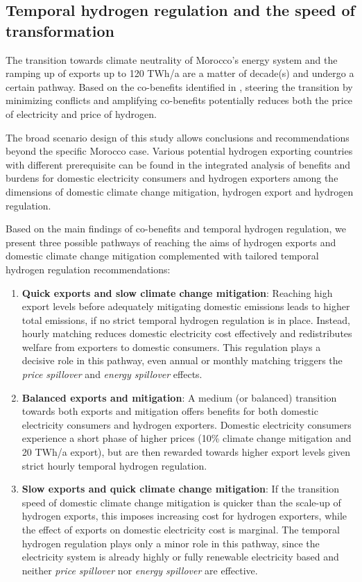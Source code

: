 \subsection*{Temporal hydrogen regulation and the speed of transformation}
\label{subsec:timepath}
The transition towards climate neutrality of Morocco's energy system and the ramping up of exports up to 120 TWh/a are a matter of decade(s) and undergo a certain pathway. Based on the co-benefits identified in , steering the transition by minimizing conflicts and amplifying co-benefits potentially reduces both the price of electricity and price of hydrogen. 

The broad scenario design of this study allows conclusions and recommendations beyond the specific Morocco case.
Various potential hydrogen exporting countries with different prerequisite can be found in the integrated analysis of benefits and burdens for domestic electricity consumers and hydrogen exporters among the dimensions of domestic climate change mitigation, hydrogen export and hydrogen regulation.

Based on the main findings of co-benefits and temporal hydrogen regulation, we present three possible pathways of reaching the aims of hydrogen exports and domestic climate change mitigation complemented with tailored temporal hydrogen regulation recommendations:
\begin{enumerate}
    \item \textbf{Quick exports and slow climate change mitigation}: Reaching high export levels before adequately mitigating domestic emissions leads to higher total emissions, if no strict temporal hydrogen regulation is in place. Instead, hourly matching reduces domestic electricity cost effectively and redistributes welfare from exporters to domestic consumers. This regulation plays a decisive role in this pathway, even annual or monthly matching triggers the \textit{price spillover} and \textit{energy spillover} effects.
    \item \textbf{Balanced exports and mitigation}: A medium (or balanced) transition towards both exports and mitigation offers benefits for both domestic electricity consumers and hydrogen exporters. Domestic electricity consumers experience a short phase of higher prices (10\% climate change mitigation and 20 TWh/a export), but are then rewarded towards higher export levels given strict hourly temporal hydrogen regulation.
    \item \textbf{Slow exports and quick climate change mitigation}: If the transition speed of domestic climate change mitigation 
    is quicker than the scale-up of hydrogen exports, this imposes increasing cost for hydrogen exporters, while the effect of exports on domestic electricity cost is marginal. The temporal hydrogen regulation plays only a minor role in this pathway, since the electricity system is already highly or fully renewable electricity based and neither \textit{price spillover} nor \textit{energy spillover} are effective.
\end{enumerate}

